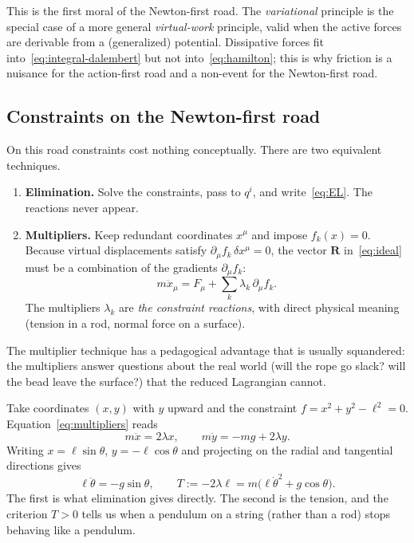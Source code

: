 This is the first moral of the Newton-first road. The \emph{variational}
principle is the special case of a more general \emph{virtual-work}
principle, valid when the active forces are derivable from a (generalized)
potential. Dissipative forces fit into~\eqref{eq:integral-dalembert} but not
into~\eqref{eq:hamilton}; this is why friction is a nuisance for the
action-first road and a non-event for the Newton-first road.

\subsection{Constraints on the Newton-first road}

On this road constraints cost nothing conceptually. There are two equivalent
techniques.

\begin{enumerate}
  \item \textbf{Elimination.} Solve the constraints, pass to $q^i$,
  and write~\eqref{eq:EL}. The reactions never appear.
  \item \textbf{Multipliers.} Keep redundant coordinates $x^\mu$ and impose
  $f_k(x)=0$. Because virtual displacements satisfy
  $\partial_\mu f_k\,\delta x^\mu=0$, the vector $\mathbf R$ in~\eqref{eq:ideal}
  must be a combination of the gradients $\partial_\mu f_k$:
  \begin{equation}
    m\ddot x_\mu=F_\mu+\sum_k\lambda_k\,\partial_\mu f_k .
    \label{eq:multipliers}
  \end{equation}
  The multipliers $\lambda_k$ are \emph{the constraint reactions}, with direct
  physical meaning (tension in a rod, normal force on a surface).
\end{enumerate}

The multiplier technique has a pedagogical advantage that is usually
squandered: the multipliers answer questions about the real world
(will the rope go slack? will the bead leave the surface?) that the reduced
Lagrangian cannot.

\begin{example}\label{ex:pendulum}
Take coordinates $(x,y)$ with $y$ upward and the constraint
$f=x^2+y^2-\ell^2=0$. Equation~\eqref{eq:multipliers} reads
\[
  m\ddot x=2\lambda x,\qquad m\ddot y=-mg+2\lambda y .
\]
Writing $x=\ell\sin\theta$, $y=-\ell\cos\theta$ and projecting on the radial
and tangential directions gives
\[
  \ell\ddot\theta=-g\sin\theta,\qquad
  T:=-2\lambda\ell=m\bigl(\ell\dot\theta^{2}+g\cos\theta\bigr).
\]
The first is what elimination gives directly. The second is the tension, and
the criterion $T>0$ tells us when a pendulum on a string (rather than a rod)
stops behaving like a pendulum.
\end{example}

